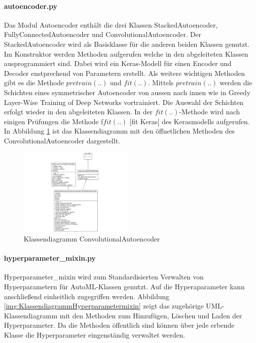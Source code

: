 	\paragraph{autoencoder.py} Das Modul Autoencoder enthält die drei Klassen StackedAutoencoder, FullyConnectedAutoencoder und ConvolutionalAutoencoder. Der StackedAutoencoder wird als Basisklasse für die anderen beiden Klassen genutzt. Im Konstruktor werden Methoden aufgerufen welche in den abgeleiteten Klassen ausprogrammiert sind. Dabei wird ein Keras-Modell für einen Encoder und Decoder enstprechend von Parametern  erstellt. Als weitere wichtigen Methoden gibt es die Methode $pretrain(..)$ und $fit(..)$. Mittels $pretrain(..)$ werden die Schichten eines symmetrischer Autoencoder von aussen nach innen wie in 	 Greedy Layer-Wise Training of Deep Networks  vortrainiert. Die Auswahl der Schichten erfolgt wieder in den abgeleiteten Klassen.
	In der $fit(..)$-Methode wird nach einigen Prüfungen die Methode f$fit(..)$ 		[fit Keras] des Kerasmodells aufgerufen. In Abbildung \ref{img:KlassendiagrammConvolutionalAutoencoder} ist das Klassendiagramm mit den öffnetlichen Methoden des ConvolutionalAutoencoder dargestellt. 
	\begin{figure}[h]
		\centering
		\includegraphics[width=0.5\textwidth, center]{bilder/Klassendiagramme/klassendiagramm_public_cae.png}
		\caption[Klassendiagramm ConvolutionalAutoencoder]{Klassendiagramm ConvolutionalAutoencoder}
		\label{img:KlassendiagrammConvolutionalAutoencoder}
	\end{figure}  
	
	\paragraph{hyperparameter\_mixin.py}  Hyperparameter\_mixin wird zum Standardisierten Verwalten von Hyperparametern für AutoML-Klassen genutzt. Auf die Hyperaparameter kann anschließend einheitlich zugegriffen werden. Abbildung \ref{img:KlassendiagrammHyperparametermixin}  zeigt das zugehörige UML-Klassendiagramm mit den Methoden zum Hinzufügen, Löschen und Laden der Hyperparameter. Da die Methoden öffentlich sind können über jede erbende Klasse die Hyperparameter eingenständig verwaltet werden.
	
